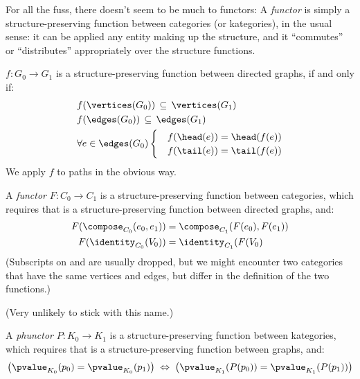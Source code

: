 \documentclass[11pt,openany]{book}
\begin{document}
For all the fuss, there doesn't seem to be much to functors:
A \textit{functor} is simply a structure-preserving function
between categories (or kategories), in the usual sense:
it can be applied any entity 
making up the structure,
and it ``commutes'' or ``distributes'' appropriately
over the structure functions.

\begin{definition}
$f:G_0 \rightarrow G_1$ is a structure-preserving function
between directed graphs, if and only if:
\begin{align*}
  & f(\vertices(G_0)) \, \subseteq \, \vertices(G_1) \\
  & f(\edges(G_0)) \, \subseteq \, \edges(G_1) \\
  & \forall e \in \edges(G_0) 
  \begin{cases}
  & f(\head(e)) = \head(f(e)) \\
  & f(\tail(e)) = \tail(f(e))
  \end{cases}
\end{align*}
We apply $f$ to paths in the obvious way.
\end{definition}

\begin{definition}
A \textit{functor} $F:C_0 \rightarrow C_1$ is 
a structure-preserving function
between categories, which requires that is a structure-preserving 
function between directed graphs, and:
\begin{align*}
  F(\compose_{C_0}(e_0,e_1)) & = \compose_{C_1}(F(e_0),F(e_1))\\
  F(\identity_{C_0}(V_0)) & = \identity_{C_1}(F(V_0)
\end{align*}
  (Subscripts on \compose and \identity 
  are usually dropped, but we might 
  encounter two categories that have the same vertices and edges,
  but differ in the definition of the two functions.)
\end{definition}

\begin{definition}
(Very unlikely to stick with this name.)

A \textit{phunctor} $P:K_0 \rightarrow K_1$ is 
a structure-preserving function
between kategories, which requires that is a structure-preserving 
function between graphs, and:
\begin{align*}
  \left( \pvalue_{K_0}(p_0) = \pvalue_{K_0}(p_1) \right)
  \; \Leftrightarrow \; 
  \left( \pvalue_{K_1}(P(p_0)) = \pvalue_{K_1}(P(p_1)) \right)
\end{align*}
\end{definition}
\end{document}
